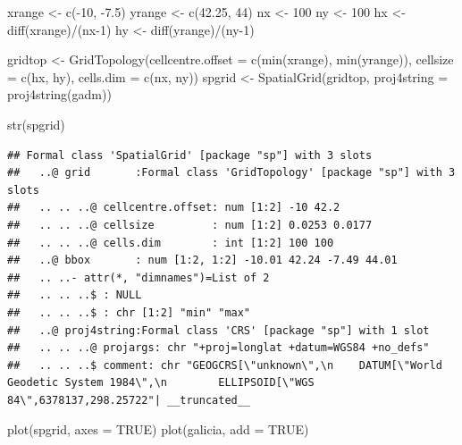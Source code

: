 \documentclass[
  spanish,
]{book}
\newenvironment{Shaded}{\begin{snugshade}}{\end{snugshade}}
\newcommand{\AttributeTok}[1]{\textcolor[rgb]{0.77,0.63,0.00}{#1}}
\newcommand{\ConstantTok}[1]{\textcolor[rgb]{0.00,0.00,0.00}{#1}}
\newcommand{\DecValTok}[1]{\textcolor[rgb]{0.00,0.00,0.81}{#1}}
\newcommand{\FloatTok}[1]{\textcolor[rgb]{0.00,0.00,0.81}{#1}}
\newcommand{\FunctionTok}[1]{\textcolor[rgb]{0.00,0.00,0.00}{#1}}
\newcommand{\NormalTok}[1]{#1}
\newcommand{\OtherTok}[1]{\textcolor[rgb]{0.56,0.35,0.01}{#1}}
\newcommand{\SpecialCharTok}[1]{\textcolor[rgb]{0.00,0.00,0.00}{#1}}
\theoremstyle{break}
\theoremstyle{definition}
\theoremstyle{definition}
\theoremstyle{definition}
\theoremstyle{definition}
\theoremstyle{remark}
\begin{document}
\begin{Shaded}
\begin{Highlighting}[]
\NormalTok{xrange }\OtherTok{\textless{}{-}} \FunctionTok{c}\NormalTok{(}\SpecialCharTok{{-}}\DecValTok{10}\NormalTok{, }\SpecialCharTok{{-}}\FloatTok{7.5}\NormalTok{)}
\NormalTok{yrange }\OtherTok{\textless{}{-}} \FunctionTok{c}\NormalTok{(}\FloatTok{42.25}\NormalTok{, }\DecValTok{44}\NormalTok{)}
\NormalTok{nx }\OtherTok{\textless{}{-}} \DecValTok{100}
\NormalTok{ny }\OtherTok{\textless{}{-}} \DecValTok{100}
\NormalTok{hx }\OtherTok{\textless{}{-}} \FunctionTok{diff}\NormalTok{(xrange)}\SpecialCharTok{/}\NormalTok{(nx}\DecValTok{{-}1}\NormalTok{)}
\NormalTok{hy }\OtherTok{\textless{}{-}} \FunctionTok{diff}\NormalTok{(yrange)}\SpecialCharTok{/}\NormalTok{(ny}\DecValTok{{-}1}\NormalTok{)}

\NormalTok{gridtop }\OtherTok{\textless{}{-}} \FunctionTok{GridTopology}\NormalTok{(}\AttributeTok{cellcentre.offset =} \FunctionTok{c}\NormalTok{(}\FunctionTok{min}\NormalTok{(xrange), }\FunctionTok{min}\NormalTok{(yrange)),}
                        \AttributeTok{cellsize =} \FunctionTok{c}\NormalTok{(hx, hy), }\AttributeTok{cells.dim =} \FunctionTok{c}\NormalTok{(nx, ny))}
\NormalTok{spgrid }\OtherTok{\textless{}{-}}  \FunctionTok{SpatialGrid}\NormalTok{(gridtop, }\AttributeTok{proj4string =} \FunctionTok{proj4string}\NormalTok{(gadm))}

\FunctionTok{str}\NormalTok{(spgrid)}
\end{Highlighting}
\end{Shaded}

\begin{verbatim}
## Formal class 'SpatialGrid' [package "sp"] with 3 slots
##   ..@ grid       :Formal class 'GridTopology' [package "sp"] with 3 slots
##   .. .. ..@ cellcentre.offset: num [1:2] -10 42.2
##   .. .. ..@ cellsize         : num [1:2] 0.0253 0.0177
##   .. .. ..@ cells.dim        : int [1:2] 100 100
##   ..@ bbox       : num [1:2, 1:2] -10.01 42.24 -7.49 44.01
##   .. ..- attr(*, "dimnames")=List of 2
##   .. .. ..$ : NULL
##   .. .. ..$ : chr [1:2] "min" "max"
##   ..@ proj4string:Formal class 'CRS' [package "sp"] with 1 slot
##   .. .. ..@ projargs: chr "+proj=longlat +datum=WGS84 +no_defs"
##   .. .. ..$ comment: chr "GEOGCRS[\"unknown\",\n    DATUM[\"World Geodetic System 1984\",\n        ELLIPSOID[\"WGS 84\",6378137,298.25722"| __truncated__
\end{verbatim}

\begin{Shaded}
\begin{Highlighting}[]
\FunctionTok{plot}\NormalTok{(spgrid, }\AttributeTok{axes =} \ConstantTok{TRUE}\NormalTok{)}
\FunctionTok{plot}\NormalTok{(galicia, }\AttributeTok{add =} \ConstantTok{TRUE}\NormalTok{)}
\end{Highlighting}
\end{Shaded}
\end{document}
